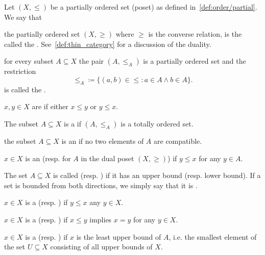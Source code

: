 \begin{definition}\label{def:poset}
  Let \( (X, \leq) \) be a partially ordered set (poset) as defined in~\cref{def:order/partial}. We say that

  \begin{defenum}
     the partially ordered set \( (X, \geq) \) where \( \geq \) is the converse relation, is the called the . See~\cref{def:thin_category} for a discussion of the duality.

     for every subset \( A \subseteq X \) the pair \( (A, \leq_A) \) is a partially ordered set and the restriction
    \begin{equation*}
      \leq_A \coloneqq \{ (a, b) \in \leq \colon a \in A \land b \in A \}.
    \end{equation*}
    is called the .

     \( x, y \in X \) are  if either \( x \leq y \) or \( y \leq x \).

     The subset \( A \subseteq X \) is a  if \( (A, \leq_A) \) is a totally ordered set.

     the subset \( A \subseteq X \) is an  if no two elements of \( A \) are compatible.

    \cite[170]{Enderton1977} \( x \in X \) is an  (resp.  for \( A \) in the dual poset \( (X, \geq) \)) if \( y \leq x \) for any \( y \in A \).

     The set \( A \subseteq X \) is called  (resp. ) if it has an upper bound (resp. lower bound). If a set is bounded from both directions, we simply say that it is .

    \cite[171]{Enderton1977} \( x \in X \) is a  (resp. ) if \( y \leq x \) any \( y \in X \).

    \cite[170]{Enderton1977} \( x \in X \) is a  (resp. ) if \( x \leq y \) implies \( x = y \) for any \( y \in X \).

    \cite[170]{Enderton1977} \( x \in X \) is a  (resp. ) if \( x \) is the least upper bound of \( A \), i.e. the smallest element of the set \( U \subseteq X \) consisting of all upper bounds of \( X \).
  \end{defenum}
\end{definition}

